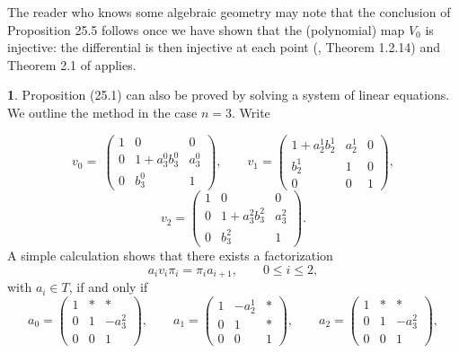 \documentclass{surv-l}
\theoremstyle{plain}
\theoremstyle{definition}
\newtheorem{remark}[theorem]{\sc{Remark}}
\numberwithin{equation}{chapter}
\begin{document}
The reader who knows some algebraic geometry may note that the conclusion of Proposition 25.5 follows once we have shown that the (polynomial) map $V_{0}$ is injective: the differential is then injective at each point (\cite{Ra}, Theorem 1.2.14) and Theorem 2.1 of \cite{BCW} applies.
\renewcommand\thetheorem{25.\arabic{theorem}}
\setcounter{theorem}{13}
\begin{remark}\label{rem25.14}
Proposition (25.1) can also be proved by solving a system of linear equations. We outline the method in the case $n=3$. Write
\end{remark}
\begin{equation*}
v_{0}=\ \left(\begin{array}{ccc}
1 & 0 & 0\\
0 & 1+a_{3}^{0}b_{3}^{0} & a_{3}^{0}\\
0 & b_{3}^{0} & 1
\end{array}\right),\qquad v_{1}=\left(\begin{array}{ccc}
1+a_{2}^{1}b_{2}^{1} & a_{2}^{1} & 0\\
b_{2}^{1} & 1 & 0\\
0 & 0 & 1
\end{array}\right),
\end{equation*}
\begin{equation*}
v_{2}=\left(\begin{array}{ccc}
1 & 0 & 0\\
0 & 1+a_{3}^{2}b_{3}^{2} & a_{3}^{2}\\
0 & b_{3}^{2} & 1
\end{array}\right).
\end{equation*}
A simple calculation shows that there exists a factorization
\begin{equation*}
a_{i}v_{i}\pi_{i}=\pi_{i}a_{i+1},\qquad 0\leq i\leq 2,
\end{equation*}
with $a_{i}\in T$, if and only if
\begin{equation*}
a_{0}=\left(\begin{array}{ccc}
1 & * & *\\
0 & 1 & -a_{3}^{2}\\
0 & 0 & 1
\end{array}\right),\qquad  {a}_{1}=\left(\begin{array}{ccc}
1 & -a_{2}^{1} & *\\
0 & 1 & *\\
0 & 0 & 1
\end{array}\right),\qquad  a_{2}=\left(\begin{array}{ccc}
1 & * & *\\
0 & 1 & -a_{3}^{2}\\
0 & 0 & 1
\end{array}\right),
\end{equation*}
\end{document}
